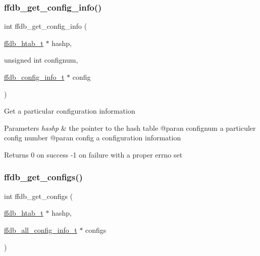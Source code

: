 \subsubsection{\texorpdfstring{ffdb\_get\_config\_info()}{ffdb\_get\_config\_info()}}
{\footnotesize\ttfamily int ffdb\+\_\+get\+\_\+config\+\_\+info (\begin{DoxyParamCaption}\item[{\mbox{\hyperlink{adat-devel_2other__libs_2filedb_2filehash_2ffdb__hash_8h_ae592010ed2bedc975d3cc0b7d074b9d1}{ffdb\+\_\+htab\+\_\+t}} $\ast$}]{hashp,  }\item[{unsigned int}]{confignum,  }\item[{\mbox{\hyperlink{adat-devel_2other__libs_2filedb_2filehash_2ffdb__db_8h_acc961fbd2faf6a849a1620309100fda1}{ffdb\+\_\+config\+\_\+info\+\_\+t}} $\ast$}]{config }\end{DoxyParamCaption})}

Get a particular configuration information 
\begin{DoxyParams}{Parameters}
{\em hashp} & the pointer to the hash table @paran confignum a particuler config number @paran config a configuration information\\
\hline
\end{DoxyParams}
\begin{DoxyReturn}{Returns}
0 on success -\/1 on failure with a proper errno set 
\end{DoxyReturn}
\mbox{\label{adat-devel_2other__libs_2filedb_2filehash_2ffdb__hash_8h_acb33ae9d0409ad9cb7d805d9448a5742}} 
\subsubsection{\texorpdfstring{ffdb\_get\_configs()}{ffdb\_get\_configs()}}
{\footnotesize\ttfamily int ffdb\+\_\+get\+\_\+configs (\begin{DoxyParamCaption}\item[{\mbox{\hyperlink{adat-devel_2other__libs_2filedb_2filehash_2ffdb__hash_8h_ae592010ed2bedc975d3cc0b7d074b9d1}{ffdb\+\_\+htab\+\_\+t}} $\ast$}]{hashp,  }\item[{\mbox{\hyperlink{adat-devel_2other__libs_2filedb_2filehash_2ffdb__db_8h_afc17234e7cd387e11de55b92df6bb0e5}{ffdb\+\_\+all\+\_\+config\+\_\+info\+\_\+t}} $\ast$}]{configs }\end{DoxyParamCaption})}

